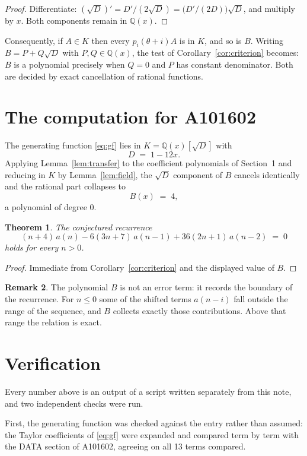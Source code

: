 \documentclass[11pt,a4paper]{article}
\theoremstyle{plain}
\newtheorem{theorem}{Theorem}
\theoremstyle{definition}
\newtheorem{remark}[theorem]{Remark}
\begin{document}
\begin{proof}
Differentiate: $(\sqrt{D})'=D'/(2\sqrt{D})=\bigl(D'/(2D)\bigr)\sqrt{D}$, and multiply by
$x$. Both components remain in $\mathbb{Q}(x)$.
\end{proof}

Consequently, if $A\in K$ then every $p_{i}(\theta+i)A$ is in $K$, and so is $B$. Writing
$B=P+Q\sqrt{D}$ with $P,Q\in\mathbb{Q}(x)$, the test of Corollary~\ref{cor:criterion}
becomes: $B$ is a polynomial precisely when $Q=0$ and $P$ has constant denominator. Both
are decided by exact cancellation of rational functions.

\section{The computation for A101602}

The generating function \eqref{eq:gf} lies in $K=\mathbb{Q}(x)[\sqrt{D}]$ with
\[
D \;=\; 1 - 12 x .
\]
Applying Lemma~\ref{lem:transfer} to the coefficient polynomials of Section~1 and reducing
in $K$ by Lemma~\ref{lem:field}, the $\sqrt{D}$ component of $B$ cancels identically and
the rational part collapses to
\[
B(x)\;=\;4 ,
\]
a polynomial of degree $0$.

\begin{theorem}
The conjectured recurrence
\[
(n + 4)\,a(n) -  6 \left(3 n + 7\right)\,a(n-1) + 36 \left(2 n + 1\right)\,a(n-2) \;=\;0
\]
holds for every $n>0$.
\end{theorem}

\begin{proof}
Immediate from Corollary~\ref{cor:criterion} and the displayed value of $B$.
\end{proof}

\begin{remark}
The polynomial $B$ is not an error term: it records the boundary of the recurrence. For
$n\le0$ some of the shifted terms $a(n-i)$ fall outside the range of the sequence,
and $B$ collects exactly those contributions. Above that range the relation is exact.
\end{remark}

\section{Verification}

Every number above is an output of a script written separately from this note, and two
independent checks were run.

First, the generating function was checked against the entry rather than assumed: the
Taylor coefficients of \eqref{eq:gf} were expanded and compared term by term with the DATA
section of A101602, agreeing on all 13 terms compared.
\end{document}
